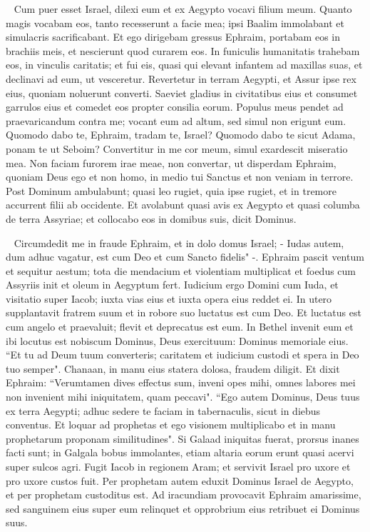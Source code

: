 \begin{biblechapter}   
\verse Cum puer esset Israel, dilexi eum et ex Aegypto vocavi filium meum. 
\verse Quanto magis vocabam eos, tanto recesserunt a facie mea; ipsi Baalim immolabant et simulacris sacrificabant. 
\verse Et ego dirigebam gressus Ephraim, portabam eos in brachiis meis, et nescierunt quod curarem eos. 
\verse In funiculis humanitatis trahebam eos, in vinculis caritatis; et fui eis, quasi qui elevant infantem ad maxillas suas, et declinavi ad eum, ut vesceretur. 
\verse Revertetur in terram Aegypti, et Assur ipse rex eius, quoniam noluerunt converti. 
\verse Saeviet gladius in civitatibus eius et consumet garrulos eius et comedet eos propter consilia eorum. 
\verse Populus meus pendet ad praevaricandum contra me; vocant eum ad altum, sed simul non erigunt eum. 
\verse Quomodo dabo te, Ephraim, tradam te, Israel? Quomodo dabo te sicut Adama, ponam te ut Seboim? Convertitur in me cor meum, simul exardescit miseratio mea. 
\verse Non faciam furorem irae meae, non convertar, ut disperdam Ephraim, quoniam Deus ego et non homo, in medio tui Sanctus et non veniam in terrore. 
\verse Post Dominum ambulabunt; quasi leo rugiet, quia ipse rugiet, et in tremore accurrent filii ab occidente. 
\verse Et avolabunt quasi avis ex Aegypto et quasi columba de terra Assyriae; et collocabo eos in domibus suis, dicit Dominus. 
\end{biblechapter}

\begin{biblechapter}   
\verse Circumdedit me in fraude Ephraim, et in dolo domus Israel; - Iudas autem, dum adhuc vagatur, est cum Deo et cum Sancto fidelis" -. 
\verse Ephraim pascit ventum et sequitur aestum; tota die mendacium et violentiam multiplicat et foedus cum Assyriis init et oleum in Aegyptum fert. 
\verse Iudicium ergo Domini cum Iuda, et visitatio super Iacob; iuxta vias eius et iuxta opera eius reddet ei. 
\verse In utero supplantavit fratrem suum et in robore suo luctatus est cum Deo. 
\verse Et luctatus est cum angelo et praevaluit; flevit et deprecatus est eum. In Bethel invenit eum et ibi locutus est nobiscum 
\verse Dominus, Deus exercituum: Dominus memoriale eius. 
\verse “Et tu ad Deum tuum converteris; caritatem et iudicium custodi et spera in Deo tuo semper". 
\verse Chanaan, in manu eius statera dolosa, fraudem diligit. 
\verse Et dixit Ephraim: “Verumtamen dives effectus sum, inveni opes mihi, omnes labores mei non invenient mihi iniquitatem, quam peccavi". 
\verse “Ego autem Dominus, Deus tuus ex terra Aegypti; adhuc sedere te faciam in tabernaculis, sicut in diebus conventus. 
\verse Et loquar ad prophetas et ego visionem multiplicabo et in manu prophetarum proponam similitudines". 
\verse Si Galaad iniquitas fuerat, prorsus inanes facti sunt; in Galgala bobus immolantes, etiam altaria eorum erunt quasi acervi super sulcos agri. 
\verse Fugit Iacob in regionem Aram; et servivit Israel pro uxore et pro uxore custos fuit. 
\verse Per prophetam autem eduxit Dominus Israel de Aegypto, et per prophetam custoditus est. 
\verse Ad iracundiam provocavit Ephraim amarissime, sed sanguinem eius super eum relinquet et opprobrium eius retribuet ei Dominus suus. 
\end{biblechapter}

